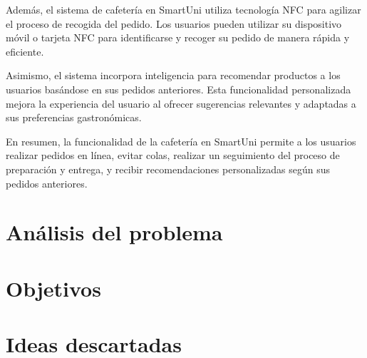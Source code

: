 \documentclass[12pt]{report}
\begin{document}
\begin{itemize}
Además, el sistema de cafetería en SmartUni utiliza tecnología NFC para agilizar el proceso de recogida del pedido. Los usuarios pueden utilizar su dispositivo móvil o tarjeta NFC para identificarse y recoger su pedido de manera rápida y eficiente.

Asimismo, el sistema incorpora inteligencia para recomendar productos a los usuarios basándose en sus pedidos anteriores. Esta funcionalidad personalizada mejora la experiencia del usuario al ofrecer sugerencias relevantes y adaptadas a sus preferencias gastronómicas.

En resumen, la funcionalidad de la cafetería en SmartUni permite a los usuarios realizar pedidos en línea, evitar colas, realizar un seguimiento del proceso de preparación y entrega, y recibir recomendaciones personalizadas según sus pedidos anteriores.
\end{itemize}

\section{Análisis del problema}

\newpage
\section{Objetivos}

\newpage
\section{Ideas descartadas}

\newpage
\end{document}
